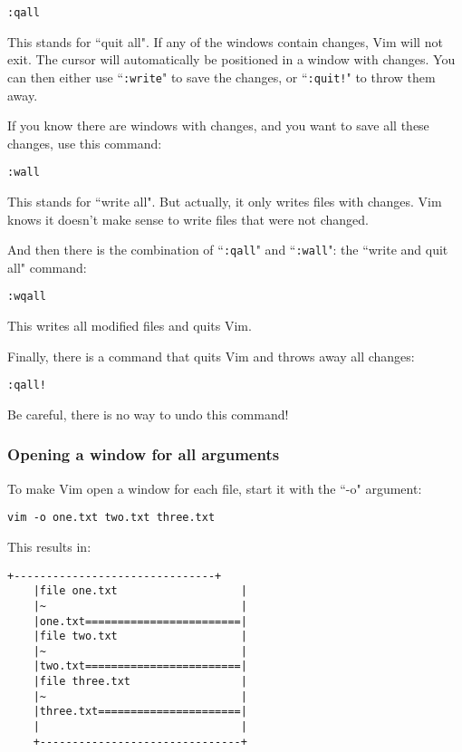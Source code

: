  \begin{Verbatim}[samepage=true]
 :qall
 \end{Verbatim}

This stands for ``quit all".
If any of the windows contain changes, Vim will not exit.
The cursor will automatically be positioned in a window with changes.
You can then either use ``\texttt{:write}" to save the changes, or ``\texttt{:quit!}" to throw them away.

If you know there are windows with changes, and you want to save all these changes, use this command:

 \begin{Verbatim}[samepage=true]
 :wall
 \end{Verbatim}

This stands for ``write all".
But actually, it only writes files with changes.
Vim knows it doesn't make sense to write files that were not changed.

And then there is the combination of ``\texttt{:qall}" and ``\texttt{:wall}": the ``write and quit all" command:

 \begin{Verbatim}[samepage=true]
 :wqall
 \end{Verbatim}

This writes all modified files and quits Vim.

Finally, there is a command that quits Vim and throws away all changes:

 \begin{Verbatim}[samepage=true]
 :qall!
 \end{Verbatim}

Be careful, there is no way to undo this command!
\subsubsection{Opening a window for all arguments}
To make Vim open a window for each file, start it with the ``-o" argument:

 \begin{Verbatim}[samepage=true]
 vim -o one.txt two.txt three.txt
 \end{Verbatim}

This results in:

\begin{Verbatim}[samepage=true]
    +-------------------------------+
    |file one.txt                   |
    |~                              |
    |one.txt========================|
    |file two.txt                   |
    |~                              |
    |two.txt========================|
    |file three.txt                 |
    |~                              |
    |three.txt======================|
    |                               |
    +-------------------------------+
\end{Verbatim}


